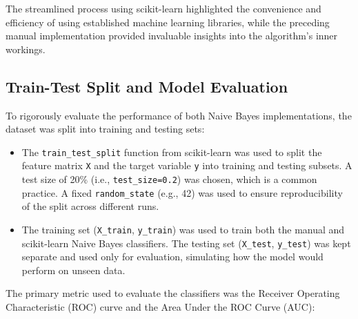 \documentclass[12pt,letterpaper]{article}
\begin{document}
The streamlined process using scikit-learn highlighted the convenience and efficiency of using established machine learning libraries, while the preceding manual implementation provided invaluable insights into the algorithm's inner workings.

\subsection{Train-Test Split and Model Evaluation}

To rigorously evaluate the performance of both Naive Bayes implementations, the dataset was split into training and testing sets:

\begin{itemize}
    \item The \texttt{train\_test\_split} function from scikit-learn was used to split the feature matrix \texttt{X} and the target variable \texttt{y} into training and testing subsets. A test size of 20\% (i.e., \texttt{test\_size=0.2}) was chosen, which is a common practice. A fixed \texttt{random\_state} (e.g., 42) was used to ensure reproducibility of the split across different runs.
    
    \item The training set (\texttt{X\_train}, \texttt{y\_train}) was used to train both the manual and scikit-learn Naive Bayes classifiers. The testing set (\texttt{X\_test}, \texttt{y\_test}) was kept separate and used only for evaluation, simulating how the model would perform on unseen data.
\end{itemize}

The primary metric used to evaluate the classifiers was the Receiver Operating Characteristic (ROC) curve and the Area Under the ROC Curve (AUC):
\end{document}
